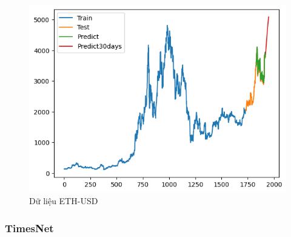 \documentclass[conference]{IEEEtran}
\begin{document}
\begin{figure}[H]
\begin{minipage}{0.15\textwidth}
		\includegraphics[width=1\textwidth]{Figure/GRU_ETH_91.png}
	\end{minipage}
	\caption{Dữ liệu ETH-USD}
	\label{fig:1}
\end{figure}

\subsubsection{TimesNet}
\end{document}
